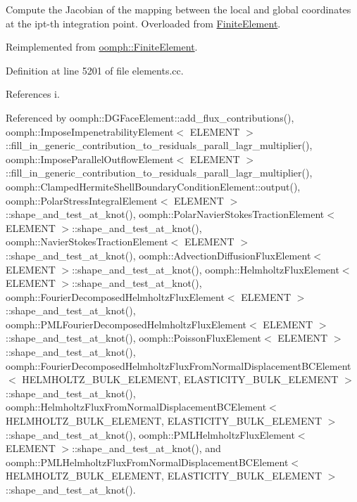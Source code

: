 Compute the Jacobian of the mapping between the local and global coordinates at the ipt-\/th integration point. Overloaded from \hyperlink{classoomph_1_1FiniteElement}{Finite\+Element}. 

Reimplemented from \hyperlink{classoomph_1_1FiniteElement_aa8a201e448a9200af7f87d612ef01227}{oomph\+::\+Finite\+Element}.



Definition at line 5201 of file elements.\+cc.



References i.



Referenced by oomph\+::\+D\+G\+Face\+Element\+::add\+\_\+flux\+\_\+contributions(), oomph\+::\+Impose\+Impenetrability\+Element$<$ E\+L\+E\+M\+E\+N\+T $>$\+::fill\+\_\+in\+\_\+generic\+\_\+contribution\+\_\+to\+\_\+residuals\+\_\+parall\+\_\+lagr\+\_\+multiplier(), oomph\+::\+Impose\+Parallel\+Outflow\+Element$<$ E\+L\+E\+M\+E\+N\+T $>$\+::fill\+\_\+in\+\_\+generic\+\_\+contribution\+\_\+to\+\_\+residuals\+\_\+parall\+\_\+lagr\+\_\+multiplier(), oomph\+::\+Clamped\+Hermite\+Shell\+Boundary\+Condition\+Element\+::output(), oomph\+::\+Polar\+Stress\+Integral\+Element$<$ E\+L\+E\+M\+E\+N\+T $>$\+::shape\+\_\+and\+\_\+test\+\_\+at\+\_\+knot(), oomph\+::\+Polar\+Navier\+Stokes\+Traction\+Element$<$ E\+L\+E\+M\+E\+N\+T $>$\+::shape\+\_\+and\+\_\+test\+\_\+at\+\_\+knot(), oomph\+::\+Navier\+Stokes\+Traction\+Element$<$ E\+L\+E\+M\+E\+N\+T $>$\+::shape\+\_\+and\+\_\+test\+\_\+at\+\_\+knot(), oomph\+::\+Advection\+Diffusion\+Flux\+Element$<$ E\+L\+E\+M\+E\+N\+T $>$\+::shape\+\_\+and\+\_\+test\+\_\+at\+\_\+knot(), oomph\+::\+Helmholtz\+Flux\+Element$<$ E\+L\+E\+M\+E\+N\+T $>$\+::shape\+\_\+and\+\_\+test\+\_\+at\+\_\+knot(), oomph\+::\+Fourier\+Decomposed\+Helmholtz\+Flux\+Element$<$ E\+L\+E\+M\+E\+N\+T $>$\+::shape\+\_\+and\+\_\+test\+\_\+at\+\_\+knot(), oomph\+::\+P\+M\+L\+Fourier\+Decomposed\+Helmholtz\+Flux\+Element$<$ E\+L\+E\+M\+E\+N\+T $>$\+::shape\+\_\+and\+\_\+test\+\_\+at\+\_\+knot(), oomph\+::\+Poisson\+Flux\+Element$<$ E\+L\+E\+M\+E\+N\+T $>$\+::shape\+\_\+and\+\_\+test\+\_\+at\+\_\+knot(), oomph\+::\+Fourier\+Decomposed\+Helmholtz\+Flux\+From\+Normal\+Displacement\+B\+C\+Element$<$ H\+E\+L\+M\+H\+O\+L\+T\+Z\+\_\+\+B\+U\+L\+K\+\_\+\+E\+L\+E\+M\+E\+N\+T, E\+L\+A\+S\+T\+I\+C\+I\+T\+Y\+\_\+\+B\+U\+L\+K\+\_\+\+E\+L\+E\+M\+E\+N\+T $>$\+::shape\+\_\+and\+\_\+test\+\_\+at\+\_\+knot(), oomph\+::\+Helmholtz\+Flux\+From\+Normal\+Displacement\+B\+C\+Element$<$ H\+E\+L\+M\+H\+O\+L\+T\+Z\+\_\+\+B\+U\+L\+K\+\_\+\+E\+L\+E\+M\+E\+N\+T, E\+L\+A\+S\+T\+I\+C\+I\+T\+Y\+\_\+\+B\+U\+L\+K\+\_\+\+E\+L\+E\+M\+E\+N\+T $>$\+::shape\+\_\+and\+\_\+test\+\_\+at\+\_\+knot(), oomph\+::\+P\+M\+L\+Helmholtz\+Flux\+Element$<$ E\+L\+E\+M\+E\+N\+T $>$\+::shape\+\_\+and\+\_\+test\+\_\+at\+\_\+knot(), and oomph\+::\+P\+M\+L\+Helmholtz\+Flux\+From\+Normal\+Displacement\+B\+C\+Element$<$ H\+E\+L\+M\+H\+O\+L\+T\+Z\+\_\+\+B\+U\+L\+K\+\_\+\+E\+L\+E\+M\+E\+N\+T, E\+L\+A\+S\+T\+I\+C\+I\+T\+Y\+\_\+\+B\+U\+L\+K\+\_\+\+E\+L\+E\+M\+E\+N\+T $>$\+::shape\+\_\+and\+\_\+test\+\_\+at\+\_\+knot().

